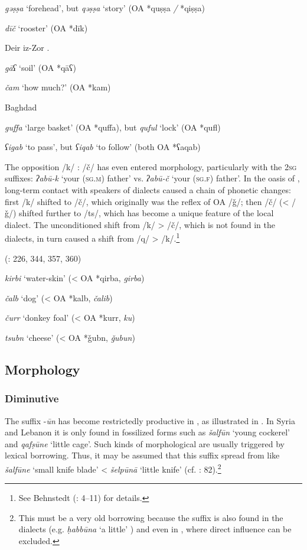 \documentclass[output=paper]{langsci/langscibook}
\begin{document}
\textit{gəṣṣa} ‘forehead’, but \textit{qəṣṣa} ‘story’ (OA *quṣṣa \textit{/} *qiṣṣa)

\textit{dīč} ‘rooster’  (OA *dīk)
\z

\ea\label{Deir}Deir iz-Zor \citep[42--43]{Jastrow1978}. 

\textit{gāʕ} ‘soil’ (OA *qāʕ)

\textit{čam} ‘how much?’ (OA *kam)
\z

\ea\label{Baghdad}Baghdad \citep[18--19]{Palva2009}

\textit{guffa} ‘large basket’ (OA *quffa), but \textit{quful} ‘lock’ (OA *qufl)

\textit{ʕigab} ‘to pass’, but \textit{ʕiqab} ‘to follow’ (both OA *ʕaqab)
\z

The opposition /k/ : /č/ has even entered morphology, particularly with the 2\textsc{sg} suffixes: \textit{ʔabū-k} `your (\textsc{sg.m}) father' vs. \textit{ʔabū-č} ‘your (\textsc{sg.f}) father’. In the  oasis of , long-term contact with speakers of  dialects caused a chain of phonetic changes: first /k/ shifted to /č/, which originally was the reflex of OA /ǧ/; then /č/ (< /ǧ/) shifted further to /ts/, which has become a unique feature of the local dialect. The unconditioned shift from /k/ > /č/, which is not found in the  dialects, in turn caused a shift from /q/ > /k/.\footnote{See Behnstedt (\citeyear{Behnstedt1994Soukhne}: 4--11) for details.}

\ea
{} (\citealt{Behnstedt1994Soukhne}: 226, 344, 357, 360)

\textit{kirbi} ‘water-skin’ (< OA *qirba,  \textit{girba})

\textit{čalb} ‘dog’ (< OA *kalb,  \textit{čalib})

\textit{čurr} ‘donkey foal’ (< OA *kurr,  \textit{ku\R\R})

\textit{tsubn} ‘cheese’ (< OA *ǧubn,  \textit{ǧubun})
\z

\subsection{Morphology}
\subsubsection{Diminutive}
The   suffix -\textit{ūn} has become restrictedly productive in   \citep[72]{Masliyah1997}, as illustrated in . In Syria and Lebanon it is only found in fossilized forms such as \textit{šalfūn} ‘young cockerel’ and \textit{qafṣūne} ‘little cage’.  Such kinds of morphological  are usually triggered by lexical borrowing. Thus, it may be assumed that this suffix spread from  like \textit{šalfūne} ‘small knife blade’ <  \textit{šelpūnā} ‘little knife’ (cf. \citealt{Féghali1918}: 82).\footnote{This must be a very old borrowing because the suffix is also found in the  dialects (e.g. \textit{ḥabbūna} ‘a little’ \citealt[279]{Holes2002}) and even in   \citep[496]{Singer1984}, where direct  influence can be excluded.}
\end{document}
